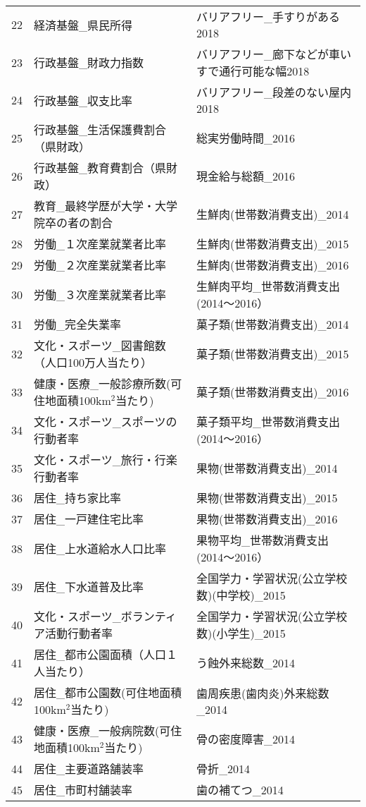\begin{table}[H]
\begin{adjustbox}{width=1\textwidth}
\begin{tabular}{rll}
  22 & 経済基盤\_県民所得 & バリアフリー\_手すりがある2018 \\
  23 & 行政基盤\_財政力指数 & バリアフリー\_廊下などが車いすで通行可能な幅2018 \\
  24 & 行政基盤\_収支比率 & バリアフリー\_段差のない屋内2018 \\
  25 & 行政基盤\_生活保護費割合（県財政） & 総実労働時間\_2016 \\
  26 & 行政基盤\_教育費割合（県財政） & 現金給与総額\_2016 \\
  27 & 教育\_最終学歴が大学・大学院卒の者の割合 & 生鮮肉(世帯数消費支出)\_2014 \\
  28 & 労働\_１次産業就業者比率 & 生鮮肉(世帯数消費支出)\_2015 \\
  29 & 労働\_２次産業就業者比率 & 生鮮肉(世帯数消費支出)\_2016 \\
  30 & 労働\_３次産業就業者比率 & 生鮮肉平均\_世帯数消費支出(2014〜2016） \\
  31 & 労働\_完全失業率 & 菓子類(世帯数消費支出)\_2014 \\
  32 & 文化・スポーツ\_図書館数（人口100万人当たり） & 菓子類(世帯数消費支出)\_2015 \\
  33 & 健康・医療\_一般診療所数(可住地面積100km$^2$当たり) & 菓子類(世帯数消費支出)\_2016 \\
  34 & 文化・スポーツ\_スポーツの行動者率 & 菓子類平均\_世帯数消費支出(2014〜2016） \\
  35 & 文化・スポーツ\_旅行・行楽行動者率 & 果物(世帯数消費支出)\_2014 \\
  36 & 居住\_持ち家比率 & 果物(世帯数消費支出)\_2015 \\
  37 & 居住\_一戸建住宅比率 & 果物(世帯数消費支出)\_2016 \\
  38 & 居住\_上水道給水人口比率 & 果物平均\_世帯数消費支出(2014〜2016） \\
  39 & 居住\_下水道普及比率 & 全国学力・学習状況(公立学校数)(中学校)\_2015 \\
  40 & 文化・スポーツ\_ボランティア活動行動者率 & 全国学力・学習状況(公立学校数)(小学生)\_2015 \\
  41 & 居住\_都市公園面積（人口１人当たり） & う蝕外来総数\_2014 \\
  42 & 居住\_都市公園数(可住地面積100km$^2$当たり) & 歯周疾患(歯肉炎)外来総数\_2014 \\
  43 & 健康・医療\_一般病院数(可住地面積100km$^2$当たり) & 骨の密度障害\_2014 \\
  44 & 居住\_主要道路舗装率 & 骨折\_2014 \\
  45 & 居住\_市町村舗装率 & 歯の補てつ\_2014 \\

\end{tabular}
\end{adjustbox}
\end{table}
